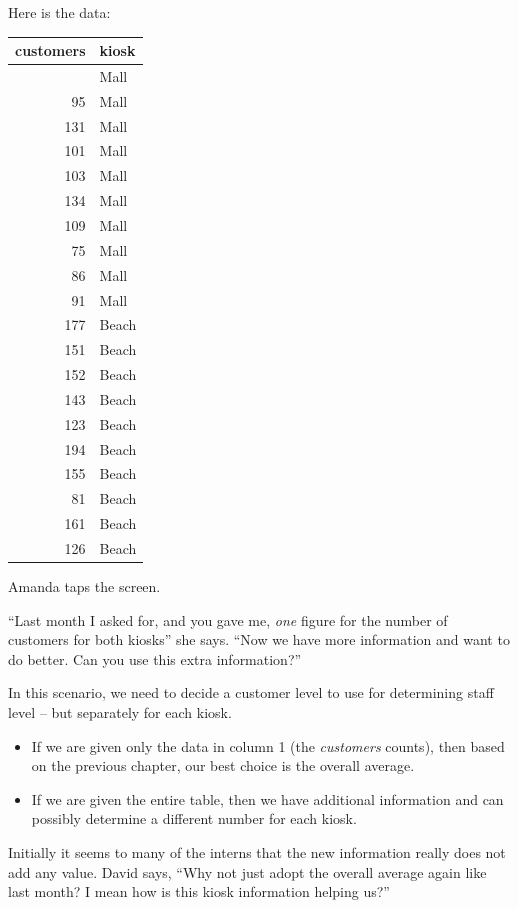 \documentclass[
  12pt,
  letterpaper,
  DIV=11,
  numbers=noendperiod]{scrreprt}
\begin{document}
Here is the data:

\begin{longtable}[]{@{}rl@{}}
\toprule\noalign{}
customers & kiosk \\
\midrule\noalign{}
\endhead
\bottomrule\noalign{}
\endlastfoot
89 & Mall \\
95 & Mall \\
131 & Mall \\
101 & Mall \\
103 & Mall \\
134 & Mall \\
109 & Mall \\
75 & Mall \\
86 & Mall \\
91 & Mall \\
177 & Beach \\
151 & Beach \\
152 & Beach \\
143 & Beach \\
123 & Beach \\
194 & Beach \\
155 & Beach \\
81 & Beach \\
161 & Beach \\
126 & Beach \\
\end{longtable}

Amanda taps the screen.

``Last month I asked for, and you gave me, \emph{one} figure for the
number of customers for both kiosks'' she says. ``Now we have more
information and want to do better. Can you use this extra information?''

In this scenario, we need to decide a customer level to use for
determining staff level -- but separately for each kiosk.

\begin{itemize}
\item
  If we are given only the data in column 1 (the \emph{customers}
  counts), then based on the previous chapter, our best choice is the
  overall average.
\item
  If we are given the entire table, then we have additional information
  and can possibly determine a different number for each kiosk.
\end{itemize}

Initially it seems to many of the interns that the new information
really does not add any value. David says, ``Why not just adopt the
overall average again like last month? I mean how is this kiosk
information helping us?''
\end{document}
